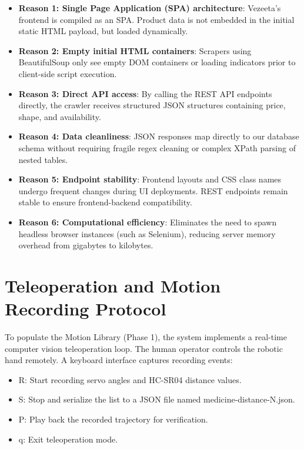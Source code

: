 \documentclass[12pt,a4paper,oneside]{report}
\begin{document}
\begin{itemize}
\item
  \textbf{Reason 1: Single Page Application (SPA) architecture}:
  Vezeeta's frontend is compiled as an SPA. Product data is not
  embedded in the initial static HTML payload, but loaded dynamically.
\item
  \textbf{Reason 2: Empty initial HTML containers}: Scrapers using
  BeautifulSoup only see empty DOM containers or loading indicators
  prior to client-side script execution.
\item
  \textbf{Reason 3: Direct API access}: By calling the REST API
  endpoints directly, the crawler receives structured JSON structures
  containing price, shape, and availability.
\item
  \textbf{Reason 4: Data cleanliness}: JSON responses map directly to
  our database schema without requiring fragile regex cleaning or
  complex XPath parsing of nested tables.
\item
  \textbf{Reason 5: Endpoint stability}: Frontend layouts and CSS class
  names undergo frequent changes during UI deployments. REST endpoints
  remain stable to ensure frontend-backend compatibility.
\item
  \textbf{Reason 6: Computational efficiency}: Eliminates the need to
  spawn headless browser instances (such as Selenium), reducing server
  memory overhead from gigabytes to kilobytes.
\end{itemize}

\section{Teleoperation and Motion Recording
Protocol}\label{teleoperation-and-motion-recording-protocol}

To populate the Motion Library (Phase 1), the system implements a
real-time computer vision teleoperation loop. The human operator
controls the robotic hand remotely. A keyboard interface captures
recording events:

\begin{itemize}
\item
  R: Start recording servo angles and HC-SR04 distance values.
\item
  S: Stop and serialize the list to a JSON file named
  medicine-distance-N.json.
\item
  P: Play back the recorded trajectory for verification.
\item
  q: Exit teleoperation mode.
\end{itemize}
\end{document}
